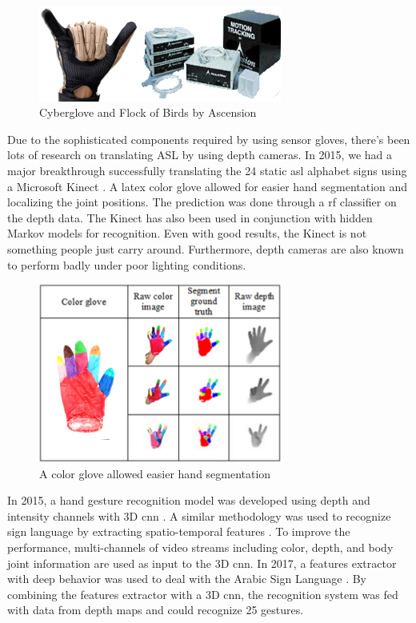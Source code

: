 \documentclass[twocolumn]{article}
\begin{document}
\begin{figure}[h]
\centering
\includegraphics[width=8cm]{./figures/cyberglove and flock of birds}
\caption{Cyberglove and Flock of Birds by Ascension}
\end{figure}

Due to the sophisticated components required by using sensor gloves, there's 
been lots of research on translating ASL by using depth cameras. In 2015, we 
had a major breakthrough successfully translating the 24 static \gls{asl} 
alphabet signs using a Microsoft Kinect \cite{dong2015american}. A latex 
color glove allowed for easier hand segmentation and localizing the joint 
positions. The prediction was done through a \gls{rf} classifier on the depth 
data. The Kinect has also been used in conjunction with hidden Markov 
models \cite{lang2012sign} for recognition. Even with good results, the Kinect 
is not something people just carry around. Furthermore, depth cameras are also 
known to perform badly under poor lighting conditions.

\begin{figure}[h]
\centering
\includegraphics[width=8cm]{./figures/color glove}
\caption{A color glove allowed easier hand segmentation}
\end{figure}

In 2015, a hand gesture recognition model was developed using depth and 
intensity channels with 3D \gls{cnn} \cite{molchanov2015hand}. A similar 
methodology was used to recognize sign language by extracting spatio-temporal 
features \cite{huang2015sign}. To improve the performance, multi-channels of 
video streams including color, depth, and body joint information are used as 
input to the 3D \gls{cnn}. In 2017, a features extractor with deep behavior 
was used to deal with the Arabic Sign Language \cite{elbadawy2017arabic}. By 
combining the features extractor with a 3D \gls{cnn}, the recognition system 
was fed with data from depth maps and could recognize 25 gestures.
\end{document}

